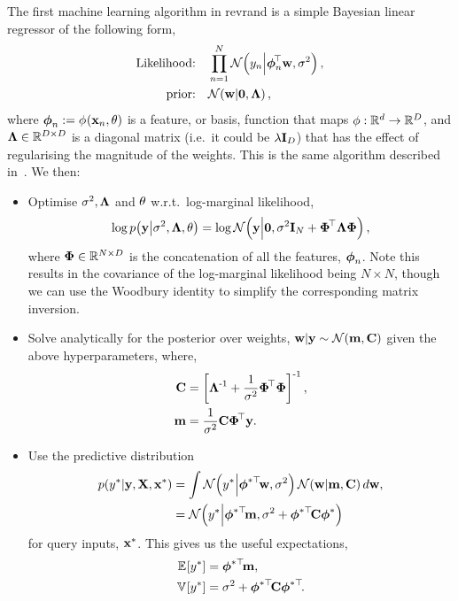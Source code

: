 \documentclass[11pt, oneside]{article}
\begin{document}
The first machine learning algorithm in revrand is a simple Bayesian linear
regressor of the following form,
\begin{align}
    \text{Likelihood:} \quad &\prod^N_{n=1} 
    \gausC{\targs_n}{\feats_n\T\weights, \var}, \\
    \text{prior:} \quad &\gausC{\weights}{\mathbf{0}, \Reg},
\end{align}
where $\feats_n := \func{\featsym}{\inss_n, \param}{}$ is a feature, or basis,
function that maps $\featsym : \real{d} \to \real{D}$, and $\Reg \in
\real{D\times D}$ is a diagonal matrix (i.e.~it could be $\reg\ident{D}$) that
has the effect of regularising the magnitude of the weights. This is the same
algorithm described in~\citet[Chapter 2]{Rasmussen2006}. We then:
\begin{itemize}
    \item Optimise $\var, \Reg$ and $\param$ w.r.t.\ log-marginal likelihood,
        \begin{equation}
            \log \probC{\targ}{\var, \Reg, \param} =
            \log \gausC{\targ}{\mathbf{0}, \var\ident{N} + \feat\T\Reg\feat},
        \end{equation}
        where $\feat \in \real{N \times D}$ is the concatenation of all the
        features, $\feats_n$. Note this results in the covariance of the
        log-marginal likelihood being $N \times N$, though we can use the
        Woodbury identity to simplify the corresponding matrix inversion.
    \item Solve analytically for the posterior over weights, $\weights | \targ
        \sim \gaus{\pomean, \pocov}$ given the above hyperparameters, where,
        \begin{align*}
            \pocov &= \sbrac{\Reg\inv + \frac{1}{\var}
                \feat\T \feat}\inv, \\
            \pomean &= \frac{1}{\var} \pocov \feat\T \targ.
        \end{align*}
    \item Use the predictive distribution
        \begin{align}
            \probC{\targs\test}{\targ, \ins, \inss\test} &= \int
            \gausC{\targs\test}{\feats\testT\weights, \var}
            \gausC{\weights}{\pomean, \pocov} d\weights, \nonumber \\
            &= \gausC{\targs\test}{\feats\testT \pomean,
                \var + \feats\testT \pocov \feats\test}
        \end{align}
        for query inputs, $\inss\test$. This gives us the useful expectations,
        \begin{align}
            \expece{}{\targs\test} &= \feats\testT\pomean, \\
            \evar{}{\targs\test} &= \var + \feats\testT\pocov\feats\testT.
        \end{align}
\end{itemize}
\end{document}
